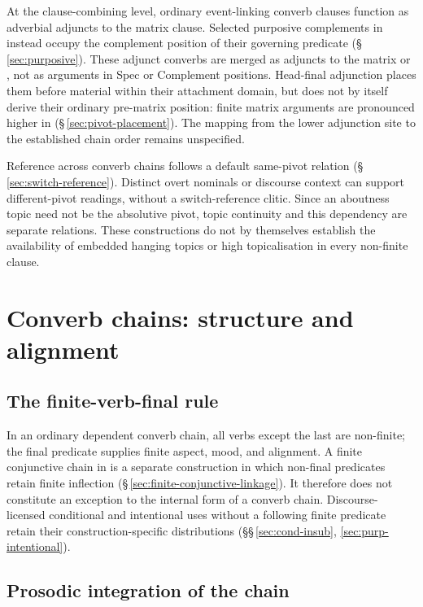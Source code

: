 At the clause-combining level, ordinary event-linking converb clauses function
as adverbial adjuncts to the matrix clause. Selected purposive complements in
 instead occupy the complement position of their governing predicate
(§\,\ref{sec:purposive}). These adjunct converbs are merged as adjuncts to the matrix
 or , not as arguments in Spec or Complement positions.
Head-final adjunction places them before material within their attachment
domain, but does not by itself derive their ordinary pre-matrix position:
finite matrix arguments are pronounced higher in 
(§\,\ref{sec:pivot-placement}). The mapping from the lower adjunction site
to the established chain order remains unspecified.

Reference across converb chains follows a default same-pivot relation
 (§\,\ref{sec:switch-reference}). Distinct overt nominals or discourse
 context can support different-pivot readings, without a switch-reference
 clitic. Since an aboutness topic need not be the absolutive pivot, topic
 continuity and this dependency are separate relations. These constructions
 do not by themselves establish the availability of embedded hanging topics
 or high topicalisation in every non-finite clause.

\section{Converb chains: structure and alignment}\label{sec:converb-chains}

\subsection{The finite-verb-final rule}

In an ordinary dependent converb chain, all verbs except the last are
non-finite; the final predicate supplies finite aspect, mood, and alignment.
A finite conjunctive chain in  is a separate construction in which
non-final predicates retain finite inflection
(§\,\ref{sec:finite-conjunctive-linkage}). It therefore does not constitute
an exception to the internal form of a converb chain. Discourse-licensed
conditional and intentional uses without a following finite predicate retain
their construction-specific distributions
(§§\,\ref{sec:cond-insub}, \ref{sec:purp-intentional}).

\subsection{Prosodic integration of the chain}\label{sec:converb-phrasing}

